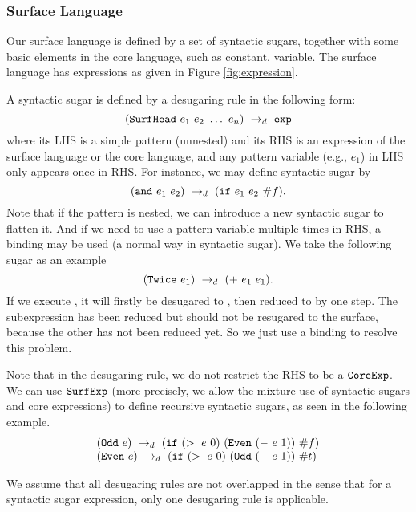 \subsubsection{Surface Language}

Our surface language is defined by a set of syntactic sugars, together with some basic elements in the core language, such as constant, variable. The surface language has expressions as given in Figure \ref{fig:expression}.

A syntactic sugar is defined by a desugaring rule in the following form:
\[
(\mbox{\tt SurfHead}~e_1~e_2~\ldots~e_n) ~\rightarrow_d~ \mbox{\tt exp}
\]
where its LHS is a simple pattern (unnested) and its RHS is an expression of the surface language or the core language, and any pattern variable (e.g., $e_1$) in LHS only appears once in RHS. For instance, we may define syntactic sugar  by
\[
(\mbox{\tt and}~e_1~e_2) ~\rightarrow_d~ (\mbox{\tt if}~e_1~e_2~\#f).
\]
Note that if the pattern is nested, we can introduce a new syntactic sugar to flatten it. And if we need to use a pattern variable multiple times in RHS, a  binding may be used (a normal way in syntactic sugar). We take the following sugar as an example
\[
(\mbox{\tt Twice}~e_1) ~\rightarrow_d~ (+~e_1~e_1).
\]
If we execute , it will firstly be desugared to , then reduced to  by one step. The subexpression  has been reduced but should not be resugared to the surface, because the other  has not been reduced yet.
So we just use a  binding to resolve this problem.

Note that in the desugaring rule, we do not restrict the RHS to be a $\mbox{\tt CoreExp}$. We can use $\mbox{\tt SurfExp}$ (more precisely, we allow the mixture use of syntactic sugars and core expressions) to define recursive syntactic sugars, as seen in the following example.
\[
\begin{array}{l}
(\mbox{\tt Odd}~e) ~\rightarrow_d~ (\mbox{\tt if}~(>~e~0)~(\mbox{\tt Even}~(-~e~1))~\#f)\\
(\mbox{\tt Even}~e) ~\rightarrow_d~ (\mbox{\tt if}~(>~e~0)~(\mbox{\tt Odd}~(-~e~1))~\#t)
\end{array}
\]

We assume that all desugaring rules are not overlapped in the sense that for a syntactic sugar expression, only one desugaring rule is applicable. 


